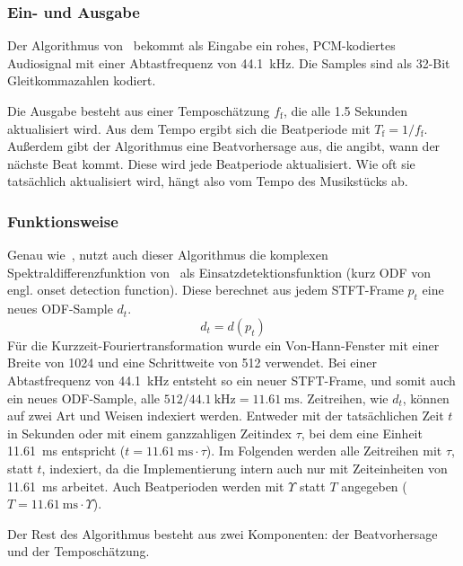 {{		\subsubsection*{Ein- und Ausgabe}
		{
			Der Algorithmus von~\cite{2009_DaPlSt} bekommt als Eingabe ein rohes, PCM-kodiertes Audiosignal mit einer Abtastfrequenz von \SI{44.1}{\kilo\hertz}.
			Die Samples sind als 32-Bit Gleitkommazahlen kodiert.

			Die Ausgabe besteht aus einer Temposchätzung $f_\text{f}$,
				die alle \num{1.5} Sekunden aktualisiert wird.
			Aus dem Tempo ergibt sich die Beatperiode mit $T_\text{f} = 1 / f_\text{f}$.
			Außerdem gibt der Algorithmus eine Beatvorhersage aus,
				die angibt,
				wann der nächste Beat kommt.
			Diese wird jede Beatperiode aktualisiert.
			Wie oft sie tatsächlich aktualisiert wird,
				hängt also vom Tempo des Musikstücks ab.
		}

		\subsubsection*{Funktionsweise}
		{
			Genau wie~\cite{2011_PlRoSt},
				nutzt auch dieser Algorithmus die komplexen Spektraldifferenzfunktion von~\cite{2004_BeDaDuSa}
				als Einsatzdetektionsfunktion (kurz ODF von engl. onset detection function).
			Diese berechnet aus jedem STFT-Frame $p_t$ eine neues ODF-Sample $d_t$.
			\begin{equation}
				d_t = d(p_t)
			\end{equation}
			Für die Kurzzeit-Fouriertransformation wurde ein Von-Hann-Fenster mit einer Breite von \num{1024} und eine Schrittweite von \num{512} verwendet.
			Bei einer Abtastfrequenz von \SI{44.1}{\kilo\hertz} entsteht so ein neuer STFT-Frame,
				und somit auch ein neues ODF-Sample,
				alle $512 / \SI{44.1}{\kilo\hertz} = \SI{11.61}{\milli\second}$.
			Zeitreihen, wie $d_t$, können auf zwei Art und Weisen indexiert werden.
			Entweder mit der tatsächlichen Zeit $t$ in Sekunden
				oder mit einem ganzzahligen Zeitindex $\tau$,
				bei dem eine Einheit \SI{11.61}{\milli\second} entspricht
				($t = \SI{11.61}{\milli\second} \cdot \tau$).
			Im Folgenden werden alle Zeitreihen mit $\tau$, statt $t$, indexiert,
				da die Implementierung intern auch nur mit Zeiteinheiten von \SI{11.61}{\milli\second} arbeitet.
			Auch Beatperioden werden mit $\Upsilon$ statt $T$ angegeben ($T = \SI{11.61}{\milli\second} \cdot \Upsilon$).


			Der Rest des Algorithmus besteht aus zwei Komponenten:
				der Beatvorhersage und der Temposchätzung.

}}}
